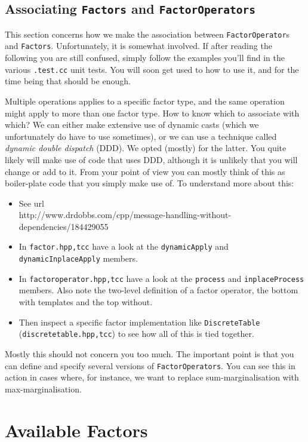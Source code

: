 \documentclass[english]{article}
\begin{document}
\subsection{Associating \texttt{Factors} and \texttt{FactorOperators}}

This section concerns how we make the association between
\texttt{FactorOperator}s and \texttt{Factors}. Unfortunately, it is
somewhat involved.  If after reading the following you are still
confused, simply follow the examples you'll find in the various
\texttt{.test.cc} unit tests. You will soon get used to how to use it,
and for the time being that should be enough.

Multiple operations applies to a specific factor type, and the same
operation might apply to more than one factor type. How to know which
to associate with which? We can either make extensive use of dynamic
casts (which we unfortunately do have to use sometimes), or we can use
a technique called \emph{dynamic double dispatch} (DDD). We opted (mostly) for the
latter. You quite likely will make use of code that uses DDD, although
it is unlikely that you will change or add to it. From your point of
view you can mostly think of this as boiler-plate code that you simply
make use of. To understand more about this:
\begin{itemize}
\item See url\\
  http://www.drdobbs.com/cpp/message-handling-without-dependencies/184429055
\item In \texttt{factor.{hpp,tcc}} have a look at the \texttt{dynamicApply} and
  \texttt{dynamicInplaceApply} members.
\item In \texttt{factoroperator.{hpp,tcc}} have a look at the \texttt{process}
  and \texttt{inplaceProcess} members. Also note the two-level definition of
  a factor operator, the bottom with templates and the top without.
\item Then inspect a specific factor implementation like \texttt{DiscreteTable}
  (\texttt{discretetable.{hpp,tcc}}) to see how all of this is tied
  together.
\end{itemize}

Mostly this should not concern you too much. The important point is
that you can define and specify several versions of
\texttt{FactorOperators}. You can see this in action in cases where,
for instance, we want to replace sum-marginalisation with
max-marginalisation.

\section{Available Factors} \label{sec:factors_specific}
\end{document}
